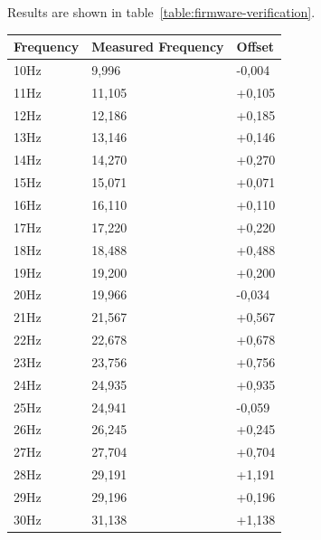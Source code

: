 Results are shown in table~\ref{table:firmware-verification}.

\begin{tabularx}{\textwidth}{lll}
\caption{Measurement Results}
\label{table:firmware-verification}
\medskip
\hline
{\bf Frequency} & {\bf Measured Frequency} & {\bf Offset} \\
\hline
\endhead

10Hz
 &
9,996
 &
-0,004
\\

11Hz
 &
11,105
 &
+0,105
\\

12Hz
 &
12,186
 &
+0,185
\\

13Hz
 &
13,146
 &
+0,146
\\

14Hz
 &
14,270
 &
+0,270
\\

15Hz
 &
15,071
 &
+0,071
\\

16Hz
 &
16,110
 &
+0,110
\\

17Hz
 &
17,220
 &
+0,220
\\

18Hz
 &
18,488
 &
+0,488
\\

19Hz
 &
19,200
 &
+0,200
\\

20Hz
 &
19,966
 &
-0,034
\\

21Hz
 &
21,567
 &
+0,567
\\

22Hz
 &
22,678
 &
+0,678
\\

23Hz
 &
23,756
 &
+0,756
\\

24Hz
 &
24,935
 &
+0,935
\\

25Hz
 &
24,941
 &
-0,059
\\

26Hz
 &
26,245
 &
+0,245
\\

27Hz
 &
27,704
 &
+0,704
\\

28Hz
 &
29,191
 &
+1,191
\\

29Hz
 &
29,196
 &
+0,196
\\

30Hz
 &
31,138
 &
+1,138
\\


\end{tabularx}
